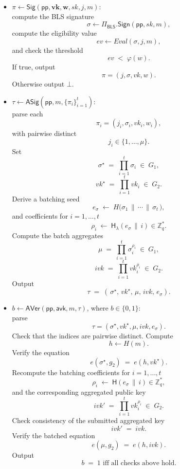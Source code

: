\documentclass{article}
\begin{document}
\begin{itemize}
  \item $\pi \leftarrow \mathsf{Sig}(\mathsf{pp}, \mathbf{vk, w}, sk, j, m)$:\\
        compute the BLS signature
        \[
          \sigma \leftarrow \Pi_{\mathsf{BLS}}.\mathsf{Sign}(\mathsf{pp}, sk, m),
        \]
        compute the eligibility value
        \[
          ev \leftarrow Eval(\sigma, j, m),
        \]
        and check the threshold
        \[
          ev \;<\;  \varphi(w).
        \]
        If true, output
        \[
          \pi=(j, \sigma, vk, w).
        \]
        Otherwise output $\bot$.




          \item $\tau \leftarrow \mathsf{ASig}(\mathsf{pp}, m, \{\pi_i\}_{i=1}^{t})$:\\
        parse each
        \[
          \pi_i=(j_i,\sigma_i,vk_i,w_i),
        \]
        with pairwise distinct
        \[
          j_i \in \{1,\dots,\mu\}.
        \]
        Set
        \[
          \sigma^\star \;=\; \prod_{i=1}^{t} \sigma_i \;\in\; G_1,
        \]
        \[
          vk^\star \;=\; \prod_{i=1}^{t} vk_i \;\in\; G_2.
        \]
        Derive a batching seed
        \[
          e_\sigma \;\leftarrow\; H\!\bigl(\sigma_1 \,\|\, \cdots \,\|\, \sigma_t \,\bigr),
        \]
        and coefficients for $i=1,\dots,t$
        \[
          \rho_i \;\leftarrow\; \mathsf{H_\lambda}(e_\sigma \,\|\, i) \in \mathbb{Z}_q^\ast.
        \]
        Compute the batch aggregates
        \[
          \mu \;=\; \prod_{i=1}^{t} \sigma_i^{\rho_i} \;\in\; G_1,
        \]
        \[
          ivk \;=\; \prod_{i=1}^{t} vk_i^{\rho_i} \;\in\; G_2.
        \]
        Output
        \[
          \tau \;=\; (\,\sigma^\star,\, vk^\star,\, \mu,\, ivk,\, e_\sigma).
        \]

  \item $b \leftarrow \mathsf{AVer}(\mathsf{pp}, \mathsf{avk}, m, \tau)$, where $b\in\{0,1\}$:\\
        parse
        \[
          \tau=(\sigma^\star, vk^\star, \mu, ivk, e_\sigma).
        \]
        Check that the indices are pairwise distinct.
        Compute
        \[
          h \leftarrow H(m).
        \]
        Verify the equation
        \[
          e(\sigma^\star, g_2) \;=\; e(h, vk^\star).
        \]
        Recompute the batching coefficients for $i=1,\dots,t$
        \[
          \rho_i \;\leftarrow\; \mathsf{H}(e_\sigma \,\|\, i) \in \mathbb{Z}_q^\ast,
        \]
        and the corresponding aggregated public key
        \[
          ivk' \;=\; \prod_{i=1}^{t} vk_i^{\rho_i} \;\in\; G_2.
        \]
        Check consistency of the submitted aggregated key
        \[
          ivk' \;=\; ivk.
        \]
        Verify the batched equation
        \[
          e(\mu, g_2) \;=\; e(h, ivk).
        \]
        Output
        \[
          b \;=\; 1 \text{ iff all checks above hold.}
        \]
\end{itemize}
\end{document}
